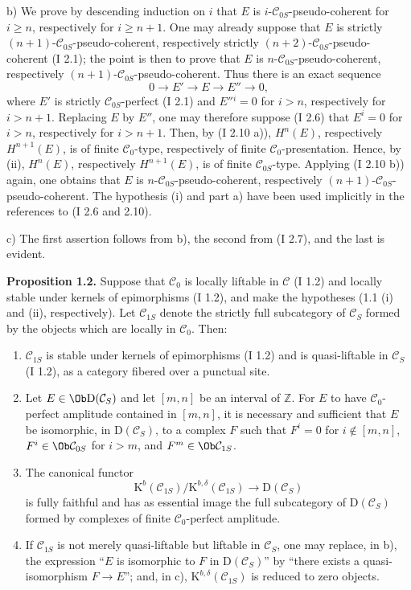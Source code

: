 b) We prove by descending induction on $i$ that $E$ is $i$-$\mathcal C_{0S}$-pseudo-coherent for $i\ge n$, respectively for $i\ge n+1$. One may already suppose that $E$ is strictly $(n+1)$-$\mathcal C_{0S}$-pseudo-coherent, respectively strictly $(n+2)$-$\mathcal C_{0S}$-pseudo-coherent (I 2.1); the point is then to prove that $E$ is $n$-$\mathcal C_{0S}$-pseudo-coherent, respectively $(n+1)$-$\mathcal C_{0S}$-pseudo-coherent. Thus there is an exact sequence
\[
0\longrightarrow E'\longrightarrow E\longrightarrow E''\longrightarrow0,
\]
where $E'$ is strictly $\mathcal C_{0S}$-perfect (I 2.1) and $E''{}^i=0$ for $i>n$, respectively for $i>n+1$. Replacing $E$ by $E''$, one may therefore suppose (I 2.6) that $E^i=0$ for $i>n$, respectively for $i>n+1$. Then, by (I 2.10 a)), $H^n(E)$, respectively $H^{n+1}(E)$, is of finite $\mathcal C_0$-type, respectively of finite $\mathcal C_0$-presentation. Hence, by (ii), $H^n(E)$, respectively $H^{n+1}(E)$, is of finite $\mathcal C_{0S}$-type. Applying (I 2.10 b)) again, one obtains that $E$ is $n$-$\mathcal C_{0S}$-pseudo-coherent, respectively $(n+1)$-$\mathcal C_{0S}$-pseudo-coherent. The hypothesis (i) and part a) have been used implicitly in the references to (I 2.6 and 2.10).

c) The first assertion follows from b), the second from (I 2.7), and the last is evident.

\textbf{Proposition 1.2.} Suppose that $\mathcal C_0$ is locally liftable in $\mathcal C$ (I 1.2) and locally stable under kernels of epimorphisms (I 1.2), and make the hypotheses (1.1 (i) and (ii), respectively). Let $\mathcal C_{1S}$ denote the strictly full subcategory of $\mathcal C_S$ formed by the objects which are locally in $\mathcal C_0$. Then:
\begin{enumerate}[label=\alph*)]
\item $\mathcal C_{1S}$ is stable under kernels of epimorphisms (I 1.2) and is quasi-liftable in $\mathcal C_S$ (I 1.2), as a category fibered over a punctual site.
\item Let $E\in\Ob\mathrm D(\mathcal C_S)$ and let $[m,n]$ be an interval of $\mathbb Z$. For $E$ to have $\mathcal C_0$-perfect amplitude contained in $[m,n]$, it is necessary and sufficient that $E$ be isomorphic, in $\mathrm D(\mathcal C_S)$, to a complex $F$ such that $F^i=0$ for $i\notin[m,n]$, $F^i\in\Ob\mathcal C_{0S}$ for $i>m$, and $F^m\in\Ob\mathcal C_{1S}$.
\item The canonical functor
\[
\mathrm K^b(\mathcal C_{1S})/\mathrm K^{b,\delta}(\mathcal C_{1S})
\longrightarrow \mathrm D(\mathcal C_S)
\]
is fully faithful and has as essential image the full subcategory of $\mathrm D(\mathcal C_S)$ formed by complexes of finite $\mathcal C_0$-perfect amplitude.
\item If $\mathcal C_{1S}$ is not merely quasi-liftable but liftable in $\mathcal C_S$, one may replace, in b), the expression ``$E$ is isomorphic to $F$ in $\mathrm D(\mathcal C_S)$'' by ``there exists a quasi-isomorphism $F\to E$''; and, in c), $\mathrm K^{b,\delta}(\mathcal C_{1S})$ is reduced to zero objects.
\end{enumerate}

